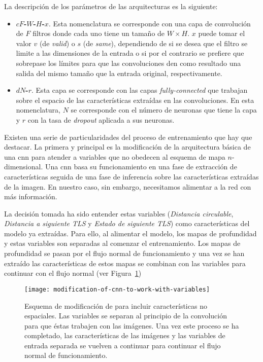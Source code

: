 La descripción de los parámetros de las arquitecturas es la siguiente:

\begin{itemize}
	\item \textbf{$cF$-$W$-$H$-$x$}. Esta nomenclatura se corresponde con una capa de convolución de $F$ filtros donde cada uno tiene un tamaño de $W \times H$. $x$ puede tomar el valor $v$ (de \textit{valid}) o $s$ (de \textit{same}), dependiendo de si se desea que el filtro se limite a las dimensiones de la entrada o si por el contrario se prefiere que sobrepase los límites para que las convoluciones den como resultado una salida del mismo tamaño que la entrada original, respectivamente.
	\item \textbf{$dN$-$r$}. Esta capa se corresponde con las capas \textit{fully-connected} que trabajan sobre el espacio de las características extraídas en las convoluciones. En esta nomenclatura, $N$ se corresponde con el número de neuronas que tiene la capa y $r$ con la tasa de \textit{dropout} aplicada a sus neuronas.
\end{itemize}

Existen una serie de particularidades del proceso de entrenamiento que hay que destacar. La primera y principal es la modificación de la arquitectura básica de una \ac{cnn} para atender a variables que no obedecen al esquema de mapa $n$-dimensional. Una \ac{cnn} basa su funcionamiento en una fase de extracción de características seguida de una fase de inferencia sobre las características extraídas de la imagen. En nuestro caso, sin embargo, necesitamos alimentar a la red con más información.

La decisión tomada ha sido entender estas variables (\textit{Distancia circulable}, \textit{Distancia a siguiente TLS} y \textit{Estado de siguiente TLS}) como características del modelo ya extraídas. Para ello, al alimentar el modelo, los mapas de profundidad y estas variables son separadas al comenzar el entrenamiento. Los mapas de profundidad se pasan por el flujo normal de funcionamiento y una vez se han extraído las características de estos mapas se combinan con las variables para continuar con el flujo normal (ver Figura~\ref{fig:modification-of-cnn-to-work-with-variables})

\begin{figure}
	\centering
	\texttt{[image: modification-of-cnn-to-work-with-variables]}
	\caption[Esquema de modificación de  para incluir características no espaciales]{Esquema de modificación de  para incluir características no espaciales. Las variables se separan al principio de la convolución para que éstas trabajen con las imágenes. Una vez este proceso se ha completado, las características de las imágenes y las variables de entrada separada se vuelven a continuar para continuar el flujo normal de funcionamiento.}
	\label{fig:modification-of-cnn-to-work-with-variables}
\end{figure}

